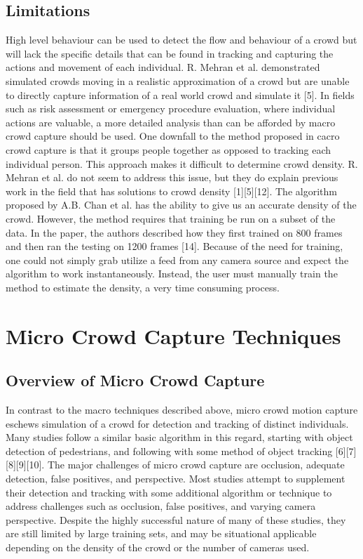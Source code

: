 \documentclass[conference]{IEEEtran}
\begin{document}
\subsection{Limitations}

High level behaviour can be used to detect the flow and behaviour of a crowd but will lack the specific details that can be found in tracking and capturing the actions and movement of each individual. R. Mehran et al. demonstrated simulated crowds moving in a realistic approximation of a crowd but are unable to directly capture information of a real world crowd and simulate it [5]. 
In fields such as risk assessment or emergency procedure evaluation, where individual actions are valuable, a more detailed analysis than can be afforded by macro crowd capture should be used.
One downfall to the method proposed in cacro crowd capture is that it groups people together as opposed to tracking each individual person. This approach makes it difficult to determine crowd density. R. Mehran et al. do not seem to address this issue, but they do explain previous work in the field that has solutions to crowd density [1][5][12]. 
The algorithm proposed by A.B. Chan et al. has the ability to give us an accurate density of the crowd. However, the method requires that training be run on a subset of the data. In the paper, the authors described how they first trained on 800 frames and then ran the testing on 1200 frames [14]. Because of the need for training, one could not simply grab utilize a feed from any camera source and expect the algorithm to work instantaneously. Instead, the user must manually train the method to estimate the density, a very time consuming process.

\section{Micro Crowd Capture Techniques}

\subsection{Overview of Micro Crowd Capture}

In contrast to the macro techniques described above, micro crowd motion capture eschews simulation of a crowd for detection and tracking of distinct individuals. Many studies follow a similar basic algorithm in this regard, starting with object detection of pedestrians, and following with some method of object tracking [6][7][8][9][10]. The major challenges of micro crowd capture are occlusion, adequate detection, false positives, and perspective. Most studies attempt to supplement their detection and tracking with some additional algorithm or technique to address challenges such as occlusion, false positives, and varying camera perspective. 
Despite the highly successful nature of many of these studies, they are still limited by large training sets, and may be situational applicable depending on the density of the crowd or the number of cameras used.
\end{document}
